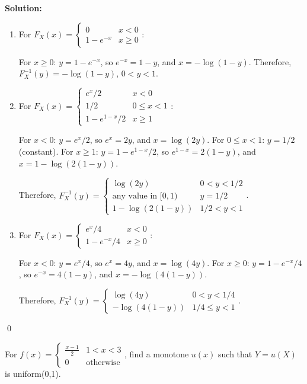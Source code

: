 \noindent\textbf{Solution:}
\begin{enumerate}[label=(\alph*)]
    \item For $F_X(x) = \begin{cases} 0 & x<0 \\ 1-e^{-x} & x\geq 0 \end{cases}$:
    
    For $x \geq 0$: $y = 1-e^{-x}$, so $e^{-x} = 1-y$, and $x = -\log(1-y)$.
    Therefore, $F_X^{-1}(y) = -\log(1-y)$, $0 < y < 1$.
    
    \item For $F_X(x) = \begin{cases} e^x/2 & x<0 \\ 1/2 & 0\leq x<1 \\ 1-e^{1-x}/2 & x\geq 1 \end{cases}$:
    
    For $x < 0$: $y = e^x/2$, so $e^x = 2y$, and $x = \log(2y)$.
    For $0 \leq x < 1$: $y = 1/2$ (constant).
    For $x \geq 1$: $y = 1-e^{1-x}/2$, so $e^{1-x} = 2(1-y)$, and $x = 1-\log(2(1-y))$.
    
    Therefore, $F_X^{-1}(y) = \begin{cases} \log(2y) & 0 < y < 1/2 \\ \text{any value in } [0,1) & y = 1/2 \\ 1-\log(2(1-y)) & 1/2 < y < 1 \end{cases}$.
    
    \item For $F_X(x) = \begin{cases} e^x/4 & x<0 \\ 1-e^{-x}/4 & x\geq 0 \end{cases}$:
    
    For $x < 0$: $y = e^x/4$, so $e^x = 4y$, and $x = \log(4y)$.
    For $x \geq 0$: $y = 1-e^{-x}/4$, so $e^{-x} = 4(1-y)$, and $x = -\log(4(1-y))$.
    
    Therefore, $F_X^{-1}(y) = \begin{cases} \log(4y) & 0 < y < 1/4 \\ -\log(4(1-y)) & 1/4 \leq y < 1 \end{cases}$.
\end{enumerate}


\qed
\begin{problembox}
For $f(x) = \begin{cases} \frac{x-1}{2} & 1<x<3 \\ 0 & \text{otherwise} \end{cases}$, find a monotone $u(x)$ such that $Y=u(X)$ is uniform(0,1).
\end{problembox}

